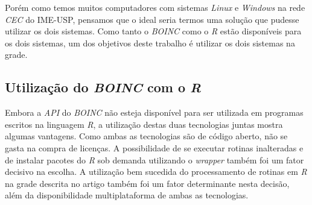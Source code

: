 Porém como temos muitos computadores com sistemas \emph{Linux} e \emph{Windows} na rede \emph{CEC} do IME-USP,
pensamos que o ideal seria termos uma solução que pudesse utilizar os dois sistemas. Como tanto o \emph{BOINC} como o 
\emph{R} estão disponíveis para os dois sistemas, um dos objetivos deste trabalho é utilizar os dois sistemas na grade.

\subsection{Utilização do \emph{BOINC} com o  \emph{R}}

Embora a \emph{API} do \emph{BOINC} não esteja disponível para ser utilizada em programas escritos na linguagem \emph{R}, 
a utilização destas duas tecnologias juntas mostra algumas vantagens. Como ambas as tecnologias são de código aberto, não
se gasta na compra de licenças. A possibilidade de se executar rotinas inalteradas e de instalar pacotes
do \emph{R} sob demanda utilizando o \emph{wrapper} também foi um fator decisivo na escolha. A 
utilização bem sucedida do processamento de rotinas em \emph{R} na grade descrita no artigo \cite{boinc} também foi um fator 
determinante nesta decisão, além da disponibilidade multiplataforma de ambas as tecnologias.



 

